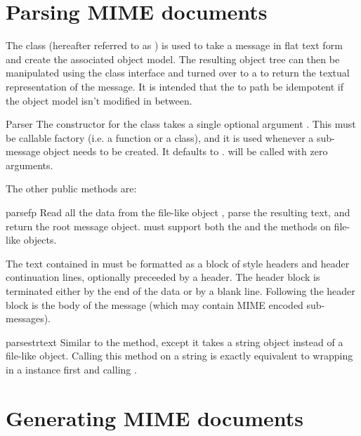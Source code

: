 \documentclass{howto}
\begin{document}
\section{Parsing MIME documents}
The  class (hereafter referred to as
) is used to take a message in flat text form and create
the associated object model.  The resulting object tree can then be
manipulated using the  class interface and turned over
to a  to return the textual representation of the
message.  It is intended that the  to 
path be idempotent if the object model isn't modified in between.

\begin{classdesc}{Parser}{}
The constructor for the  class takes a single optional
argument .  This must be callable factory (i.e. a function
or a class), and it is used whenever a sub-message object needs to be
created.   It defaults to .   will be
called with zero arguments.
\end{classdesc}

The other public  methods are:

\begin{methoddesc}[Parser]{parse}{fp}
Read all the data from the file-like object , parse the
resulting text, and return the root message object.   must
support both the  and the  methods
on file-like objects.

The text contained in  must be formatted as a block of 
style headers and header continuation lines, optionally preceeded by a
 header.  The header block is terminated either by the
end of the data or by a blank line.  Following the header block is the
body of the message (which may contain MIME encoded sub-messages).
\end{methoddesc}

\begin{methoddesc}[Parser]{parsestr}{text}
Similar to the  method, except it takes a string
object instead of a file-like object.  Calling this method on a string
is exactly equivalent to wrapping  in a 
instance first and calling .
\end{methoddesc}

\section{Generating MIME documents}
\end{document}
